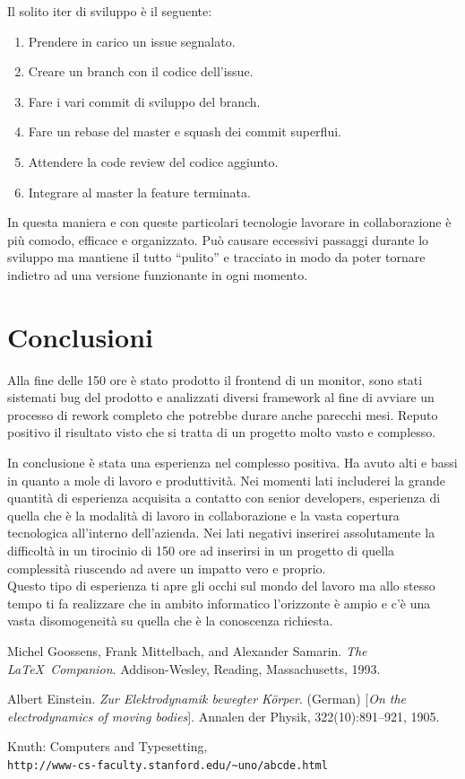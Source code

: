 \documentclass[a4paper]{article}
\begin{document}
Il solito iter di sviluppo è il seguente:
\begin{enumerate}
	\item Prendere in carico un issue segnalato.
	\item Creare un branch con il codice dell'issue.
	\item Fare i vari commit di sviluppo del branch.
	\item Fare un rebase del master e squash dei commit superflui.
	\item Attendere la code review del codice aggiunto.
	\item Integrare al master la feature terminata.
\end{enumerate}
\par In questa maniera e con queste particolari tecnologie lavorare in collaborazione
è più comodo, efficace e organizzato. Può causare eccessivi passaggi durante lo sviluppo
ma mantiene il tutto ``pulito'' e tracciato in modo da poter tornare indietro ad una
versione funzionante in ogni momento. 

\section{Conclusioni}
\par Alla fine delle 150 ore è stato prodotto il frontend di un monitor, sono stati
sistemati bug del prodotto e analizzati diversi framework al fine di avviare un
processo di rework completo che potrebbe durare anche parecchi mesi. Reputo positivo il risultato
visto che si tratta di un progetto molto vasto e complesso.
\par In conclusione è stata una esperienza nel complesso positiva. Ha avuto alti e bassi in quanto 
a mole di lavoro e produttività. Nei momenti lati includerei la grande quantità
di esperienza acquisita a contatto con senior developers, esperienza di quella che è
la modalità di lavoro in collaborazione e la vasta copertura tecnologica all'interno
dell'azienda. Nei lati negativi inserirei assolutamente la difficoltà in un tirocinio
di 150 ore ad inserirsi in un progetto di quella complessità riuscendo ad avere un 
impatto vero e proprio. \\
Questo tipo di esperienza ti apre gli occhi sul mondo del lavoro ma allo stesso tempo
ti fa realizzare che in ambito informatico l'orizzonte è ampio e c'è una vasta disomogeneità
su quella che è la conoscenza richiesta.

\renewcommand{\refname}{Bibliografia}
\begin{thebibliography}{9}
  Michel Goossens, Frank Mittelbach, and Alexander Samarin. 
  \textit{The \LaTeX\ Companion}. 
  Addison-Wesley, Reading, Massachusetts, 1993.
   
  Albert Einstein. 
  \textit{Zur Elektrodynamik bewegter K{\"o}rper}. (German) 
  [\textit{On the electrodynamics of moving bodies}]. 
  Annalen der Physik, 322(10):891–921, 1905.
   
  Knuth: Computers and Typesetting,
  \\\texttt{http://www-cs-faculty.stanford.edu/\~{}uno/abcde.html}
  \end{thebibliography}
\end{document}
